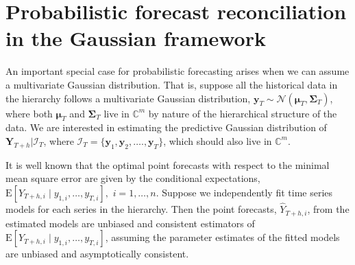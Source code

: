 \documentclass[a4paper, 11pt]{article}
\def\E{\text{E}}
\theoremstyle{theo}
\theoremstyle{definition}
\begin{document}
%
%

\section{Probabilistic forecast reconciliation in the Gaussian framework}\label{sec:gaussian}

An important special case for probabilistic forecasting arises when we can assume a multivariate Gaussian distribution. That is, suppose all the historical data in the hierarchy follows a multivariate Gaussian distribution, $\bm{y}_T \sim \mathcal{N}(\bm{\mu}_T, \bm{\Sigma}_T)$, where both $\bm{\mu}_T$ and $\bm{\Sigma}_T$ live in $\mathbb{C}^m$ by nature of the hierarchical structure of the data. We are interested in estimating the predictive Gaussian distribution of $\bm{Y}_{T+h}| \bm{\mathcal{I}}_T$, where $\bm{\mathcal{I}}_T= \{\bm{y}_1,\bm{y}_2,\dots.,\bm{y}_T\}$, which should also live in $\mathbb{C}^m$.

It is well known that the optimal point forecasts with respect to the minimal mean square error are given by the conditional expectations, $\E[Y_{T+h,i}\mid y_{1,i},\dots,y_{T,i}],$ $i=1,\dots,n$. Suppose we independently fit time series models for each series in the hierarchy. Then the point forecasts, $\hat{Y}_{T+h,i}$, from the estimated models are unbiased and consistent estimators of $\E[Y_{T+h,i}\mid y_{1,i},\dots,y_{T,i}]$, assuming the parameter estimates of the fitted models are unbiased and asymptotically consistent. 
\end{document}
